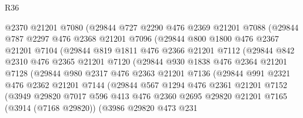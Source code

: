 \begin{lexlean}{R36}
\begin{coremodule}
              @2370
              @21201
              @7080
              (@29844
                @727
                @2290
                @476
                @2369
                @21201
                @7088
                (@29844
                  @787
                  @2297
                  @476
                  @2368
                  @21201
                  @7096
                  (@29844
                    @800
                    @1800
                    @476
                    @2367
                    @21201
                    @7104
                    (@29844
                      @819
                      @1811
                      @476
                      @2366
                      @21201
                      @7112
                      (@29844
                        @842
                        @2310
                        @476
                        @2365
                        @21201
                        @7120
                        (@29844
                          @930
                          @1838
                          @476
                          @2364
                          @21201
                          @7128
                          (@29844
                            @980
                            @2317
                            @476
                            @2363
                            @21201
                            @7136
                            (@29844
                              @991
                              @2321
                              @476
                              @2362
                              @21201
                              @7144
                              (@29844
                                @567
                                @1294
                                @476
                                @2361
                                @21201
                                @7152
                                (@3949
                                  @29820
                                  @7017
                                  @596
                                  @413
                                  @476
                                  @2360
                                  @2695
                                  @29820
                                  @21201
                                  @7165
                                  (@3914 (@7168 @29820))
                                  (@3986
                                    @29820
                                    @473
                                    @231

\end{coremodule}
\end{lexlean}
